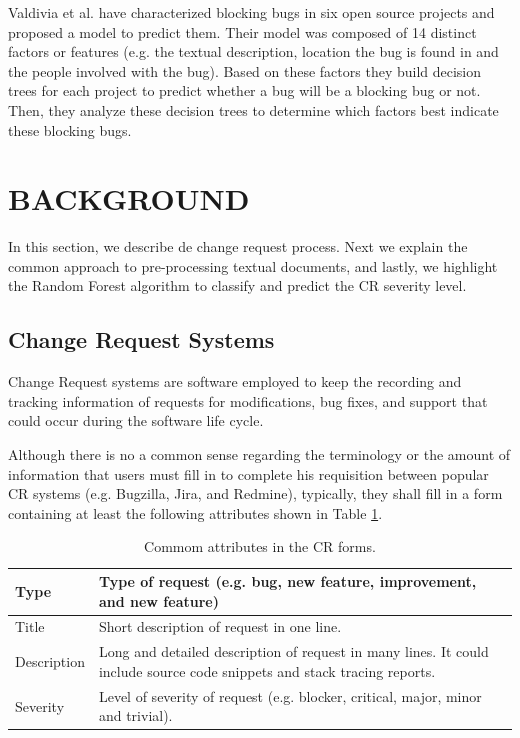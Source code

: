 \documentclass[10pt, conference]{IEEEtran}
\begin{document}
Valdivia et al.\cite{ValdiviaGarcia2014} have characterized blocking bugs in six open source projects and proposed a model to predict them. Their model was composed of 14 distinct factors or features (e.g. the textual description, location the bug is found in and the people involved with the bug). Based on these factors they build decision trees for each project to predict whether a bug will be a blocking bug or not. Then, they analyze these decision trees to determine which factors best indicate these blocking bugs. 

\section{BACKGROUND}
In this section, we describe de change request process. Next we explain the common approach to pre-processing textual documents, and lastly, we highlight the Random Forest algorithm to classify and predict the CR severity level.

\subsection{Change Request Systems}
Change Request systems\cite{Pressman2009} are software employed to keep the recording and tracking information of requests for modifications, bug fixes, and support that could occur during the software life cycle. 

Although there is no a common sense regarding the terminology or the amount of information that users must fill in to complete his requisition between popular CR systems (e.g. Bugzilla, Jira, and Redmine)\cite{Tian2012}, typically, they shall fill in a form containing at least the following attributes shown in Table \ref{tab:commom_attributes_cr_form}. 

\begin{table}[!ht]
	\renewcommand{\arraystretch}{1.3}
	\caption{Commom attributes in the CR forms.}
	\label{tab:commom_attributes_cr_form}
	\centering
	\begin{tabular}{|l|p{6cm}|}
		\hline
		Type & Type of request (e.g. bug, new feature, improvement, and new feature)\\
		\hline
		Title & Short description of request in one line.\\
		\hline
		Description & Long and detailed description of request in many lines. It could include source code snippets and stack tracing reports.\\
		\hline
		Severity & Level of severity of request (e.g. blocker, critical, major, minor and trivial).\\
		\hline 
	\end{tabular}
\end{table}
\end{document}
